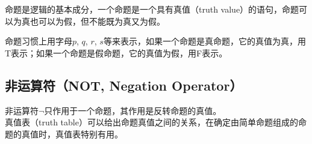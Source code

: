 \documentclass[12pt, openany, oneside]{book}
\begin{document}
命题是逻辑的基本成分，一个命题是一个具有真值（truth value）的语句，命题可以为真也可以为假，但不能既为真又为假。 \\

\begin{table}[H]
    \centering
\end{table}

命题习惯上用字母$ p $, $ q $, $ r $, $ s $等来表示，如果一个命题是真命题，它的真值为真，用T表示；如果一个命题是假命题，它的真值为假，用F表示。 \\

\subsection{非运算符（NOT, Negation Operator）}

非运算符$ \neg $只作用于一个命题，其作用是反转命题的真值。 \\

真值表（truth table）可以给出命题真值之间的关系，在确定由简单命题组成的命题的真值时，真值表特别有用。

\begin{table}[H]
    \centering
    \caption{NOT真值表}
\end{table}
\end{document}
